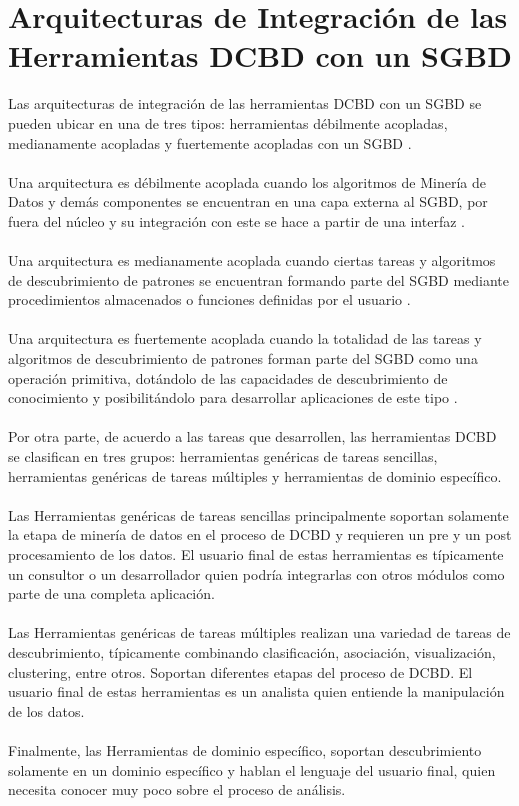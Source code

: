 \section{Arquitecturas de Integraci\'on de las Herra\-mientas DCBD con un SGBD}
Las arquitecturas de integraci\'on de las herramientas DCBD con un SGBD se pueden ubicar
en una de tres tipos:
herramientas d\'ebilmente acopladas, medianamente acopladas y fuertemente acopladas con
un SGBD \cite{30}.\\
\\
Una arquitectura es d\'ebilmente acoplada cuando los algoritmos de Miner\'ia de Datos y
dem\'as componentes se
encuentran en una capa externa al SGBD, por fuera del n\'ucleo y su integraci\'on con
este se hace a partir de una
interfaz \cite{30}.\\
\\
Una arquitectura es medianamente acoplada cuando ciertas tareas y algoritmos de
descubrimiento de patrones se
encuentran formando parte del SGBD mediante procedimientos almacenados o funciones
definidas por el usuario
\cite{30}.\\
\\
Una arquitectura es fuertemente acoplada cuando la totalidad de las tareas y algoritmos
de descubrimiento de
patrones forman parte del SGBD como una operaci\'on primitiva, dot\'andolo de las
capacidades de descubrimiento de
conocimiento y posibilit\'andolo para desarrollar aplicaciones de este tipo \cite{30}.\\
\\
Por otra parte, de acuerdo a las tareas que desarrollen, las herramientas DCBD se
clasifican en tres grupos:
herramientas gen\'ericas de tareas senci\-llas, herramientas gen\'ericas de tareas
m\'ultiples y herramientas de
dominio espec\'ifico.\\
\\
Las Herramientas gen\'ericas de tareas sencillas principalmente soportan solamente la
etapa de miner\'ia de datos
en el proceso de DCBD y requieren un pre y un post procesamiento de los datos. El usuario
final de estas
herramientas es t\'ipicamente un consultor o un desarrollador quien podr\'ia integrarlas
con otros m\'odulos como
parte de una completa aplicaci\'on.\\
\\
Las Herramientas gen\'ericas de tareas m\'ultiples realizan una variedad de ta\-reas de
descubrimiento,
t\'ipicamente combinando clasificaci\'on, asociaci\'on, visualizaci\'on, clustering,
entre otros. Soportan
diferentes etapas del proceso de DCBD. El usuario final de estas herramientas es un
analista quien entiende la
manipulaci\'on de los datos.\\
\\
Finalmente, las Herramientas de dominio espec\'ifico, soportan descubrimiento solamente
en un dominio espec\'ifico
y hablan el lenguaje del usuario final, quien necesita conocer muy poco sobre el proceso
de an\'alisis.
\newpage
